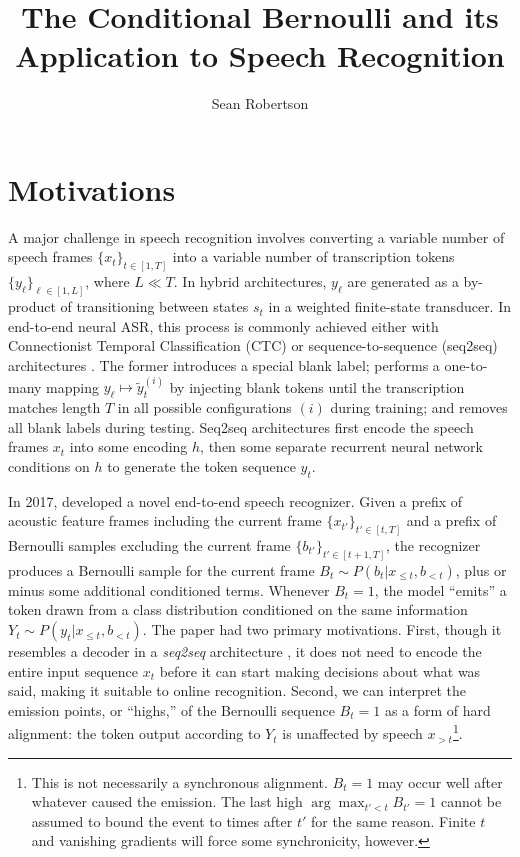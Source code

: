 \documentclass{article}
\title{The Conditional Bernoulli and its Application to Speech Recognition}
\author{Sean Robertson}
\begin{document}
\maketitle

\section{Motivations} \label{sec:motivations}

A major challenge in speech recognition involves converting a variable number
of speech frames $\{x_t\}_{t \in [1, T]}$ into a variable number of
transcription tokens $\{y_\ell\}_{\ell \in [1, L]}$, where $L \ll T$. In hybrid
architectures, $y_\ell$ are generated as a by-product of transitioning between
states $s_t$ in a weighted finite-state transducer. In end-to-end neural ASR,
this process is commonly achieved either with Connectionist Temporal
Classification (CTC) \cite{gravesConnectionistTemporalClassification2006} or
sequence-to-sequence (seq2seq) architectures
\cite{bahdanauNeuralMachineTranslation2015}. The former introduces a special
blank label; performs a one-to-many mapping $y_\ell \mapsto \tilde{y}_t^{(i)}$
by injecting blank tokens until the transcription matches length $T$ in all
possible configurations $(i)$ during training; and removes all blank labels
during testing. Seq2seq architectures first encode the speech frames $x_t$ into
some encoding $h$, then some separate recurrent neural network conditions on
$h$ to generate the token sequence $y_t$.

In 2017, \citeauthor{luoLearningOnlineAlignments2017} developed a novel
end-to-end speech recognizer. Given a prefix of acoustic feature frames
including the current frame $\{x_{t'}\}_{t' \in [t, T]}$ and a prefix of
Bernoulli samples excluding the current frame $\{b_{t'}\}_{t' \in [t+1,T]}$,
the recognizer produces a Bernoulli sample for the current frame $B_t \sim
P(b_t|x_{\leq t}, b_{<t})$, plus or minus some additional conditioned terms.
Whenever $B_t = 1$, the model ``emits'' a token drawn from a class distribution
conditioned on the same information $Y_t \sim P(y_t|x_{\leq t}, b_{<t})$. The
paper had two primary motivations. First, though it resembles a decoder in a
\textit{seq2seq} architecture \cite{bahdanauNeuralMachineTranslation2015}, it
does not need to encode the entire input sequence $x_t$ before it can start
making decisions about what was said, making it suitable to online recognition.
Second, we can interpret the emission points, or ``highs,'' of the Bernoulli
sequence $B_t = 1$ as a form of hard alignment: the token output according to
$Y_t$ is unaffected by speech $x_{>t}$\footnote{
%
    This is not necessarily a synchronous alignment. $B_t = 1$ may occur well
    after whatever caused the emission. The last high $\arg\max_{t' < t} B_{t'}
    = 1$ cannot be assumed to bound the event to times after $t'$ for the same
    reason. Finite $t$ and vanishing gradients will force some synchronicity,
    however.
%
}.
\end{document}
